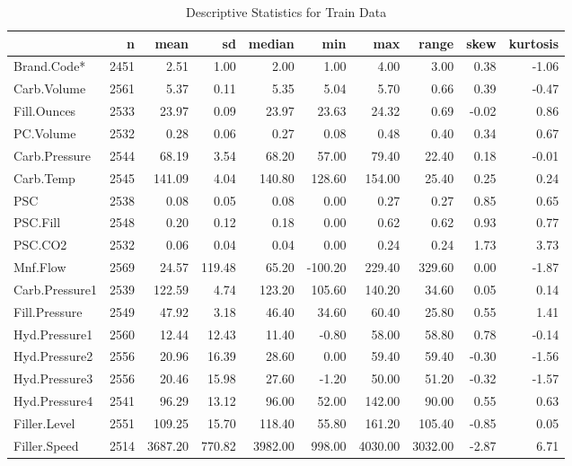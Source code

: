 \documentclass[]{article}
\begin{document}
\begin{table}

\caption{\label{tab:unnamed-chunk-5}Descriptive Statistics for Train Data}
\centering
\begin{tabular}[t]{l|r|r|r|r|r|r|r|r|r}
\hline
  & n & mean & sd & median & min & max & range & skew & kurtosis\\
\hline
Brand.Code* & 2451 & 2.51 & 1.00 & 2.00 & 1.00 & 4.00 & 3.00 & 0.38 & -1.06\\
\hline
Carb.Volume & 2561 & 5.37 & 0.11 & 5.35 & 5.04 & 5.70 & 0.66 & 0.39 & -0.47\\
\hline
Fill.Ounces & 2533 & 23.97 & 0.09 & 23.97 & 23.63 & 24.32 & 0.69 & -0.02 & 0.86\\
\hline
PC.Volume & 2532 & 0.28 & 0.06 & 0.27 & 0.08 & 0.48 & 0.40 & 0.34 & 0.67\\
\hline
Carb.Pressure & 2544 & 68.19 & 3.54 & 68.20 & 57.00 & 79.40 & 22.40 & 0.18 & -0.01\\
\hline
Carb.Temp & 2545 & 141.09 & 4.04 & 140.80 & 128.60 & 154.00 & 25.40 & 0.25 & 0.24\\
\hline
PSC & 2538 & 0.08 & 0.05 & 0.08 & 0.00 & 0.27 & 0.27 & 0.85 & 0.65\\
\hline
PSC.Fill & 2548 & 0.20 & 0.12 & 0.18 & 0.00 & 0.62 & 0.62 & 0.93 & 0.77\\
\hline
PSC.CO2 & 2532 & 0.06 & 0.04 & 0.04 & 0.00 & 0.24 & 0.24 & 1.73 & 3.73\\
\hline
Mnf.Flow & 2569 & 24.57 & 119.48 & 65.20 & -100.20 & 229.40 & 329.60 & 0.00 & -1.87\\
\hline
Carb.Pressure1 & 2539 & 122.59 & 4.74 & 123.20 & 105.60 & 140.20 & 34.60 & 0.05 & 0.14\\
\hline
Fill.Pressure & 2549 & 47.92 & 3.18 & 46.40 & 34.60 & 60.40 & 25.80 & 0.55 & 1.41\\
\hline
Hyd.Pressure1 & 2560 & 12.44 & 12.43 & 11.40 & -0.80 & 58.00 & 58.80 & 0.78 & -0.14\\
\hline
Hyd.Pressure2 & 2556 & 20.96 & 16.39 & 28.60 & 0.00 & 59.40 & 59.40 & -0.30 & -1.56\\
\hline
Hyd.Pressure3 & 2556 & 20.46 & 15.98 & 27.60 & -1.20 & 50.00 & 51.20 & -0.32 & -1.57\\
\hline
Hyd.Pressure4 & 2541 & 96.29 & 13.12 & 96.00 & 52.00 & 142.00 & 90.00 & 0.55 & 0.63\\
\hline
Filler.Level & 2551 & 109.25 & 15.70 & 118.40 & 55.80 & 161.20 & 105.40 & -0.85 & 0.05\\
\hline
Filler.Speed & 2514 & 3687.20 & 770.82 & 3982.00 & 998.00 & 4030.00 & 3032.00 & -2.87 & 6.71\\

\end{tabular}
\end{table}
\end{document}
